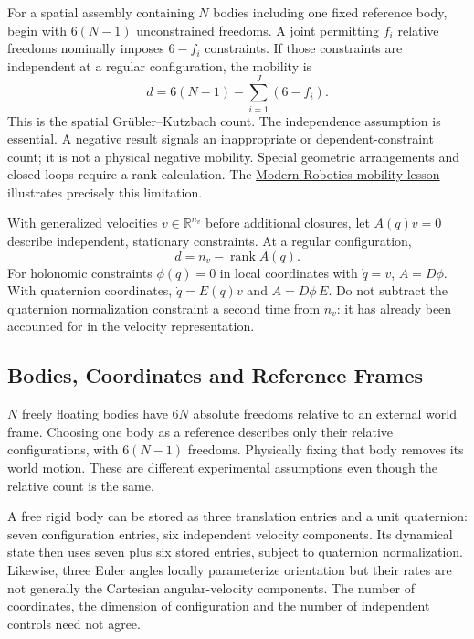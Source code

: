 For a spatial assembly containing $N$ bodies including one fixed reference body, begin with $6(N-1)$ unconstrained freedoms. A joint permitting $f_i$ relative freedoms nominally imposes $6-f_i$ constraints. If those constraints are independent at a regular configuration, the mobility is
\begin{equation}
d=6(N-1)-\sum_{i=1}^{J}(6-f_i).
\label{thm:grubler}
\end{equation}
This is the spatial Grübler--Kutzbach count. The independence assumption is essential. A negative result signals an inappropriate or dependent-constraint count; it is not a physical negative mobility. Special geometric arrangements and closed loops require a rank calculation. The \href{https://modernrobotics.northwestern.edu/nu-gm-book-resource/2-2-degrees-of-freedom-of-a-robot/}{Modern Robotics mobility lesson} illustrates precisely this limitation.

With generalized velocities $v\in\mathbb R^{n_v}$ before additional closures, let $A(q)v=0$ describe independent, stationary constraints. At a regular configuration,
\begin{equation}
d=n_v-\operatorname{rank}A(q).
\end{equation}
For holonomic constraints $\phi(q)=0$ in local coordinates with $\dot q=v$, $A=D\phi$. With quaternion coordinates, $\dot q=E(q)v$ and $A=D\phi\,E$. Do not subtract the quaternion normalization constraint a second time from $n_v$: it has already been accounted for in the velocity representation.

\subsection{Bodies, Coordinates and Reference Frames}

$N$ freely floating bodies have $6N$ absolute freedoms relative to an external world frame. Choosing one body as a reference describes only their relative configurations, with $6(N-1)$ freedoms. Physically fixing that body removes its world motion. These are different experimental assumptions even though the relative count is the same.

A free rigid body can be stored as three translation entries and a unit quaternion: seven configuration entries, six independent velocity components. Its dynamical state then uses seven plus six stored entries, subject to quaternion normalization. Likewise, three Euler angles locally parameterize orientation but their rates are not generally the Cartesian angular-velocity components. The number of coordinates, the dimension of configuration and the number of independent controls need not agree.

